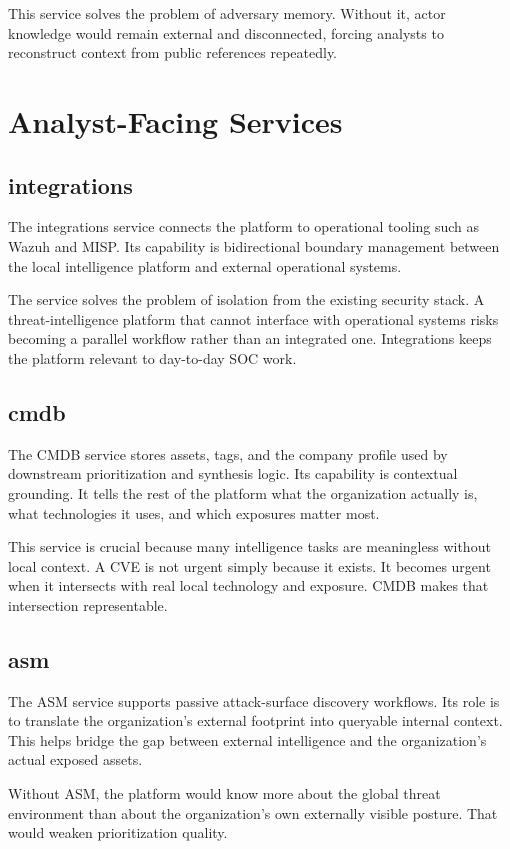 This service solves the problem of adversary memory. Without it, actor knowledge would remain external and disconnected, forcing analysts to reconstruct context from public references repeatedly.

\section{Analyst-Facing Services}
\subsection{integrations}
The integrations service connects the platform to operational tooling such as Wazuh and MISP. Its capability is bidirectional boundary management between the local intelligence platform and external operational systems.

The service solves the problem of isolation from the existing security stack. A threat-intelligence platform that cannot interface with operational systems risks becoming a parallel workflow rather than an integrated one. Integrations keeps the platform relevant to day-to-day SOC work.

\subsection{cmdb}
The CMDB service stores assets, tags, and the company profile used by downstream prioritization and synthesis logic. Its capability is contextual grounding. It tells the rest of the platform what the organization actually is, what technologies it uses, and which exposures matter most.

This service is crucial because many intelligence tasks are meaningless without local context. A CVE is not urgent simply because it exists. It becomes urgent when it intersects with real local technology and exposure. CMDB makes that intersection representable.

\subsection{asm}
The ASM service supports passive attack-surface discovery workflows. Its role is to translate the organization's external footprint into queryable internal context. This helps bridge the gap between external intelligence and the organization's actual exposed assets.

Without ASM, the platform would know more about the global threat environment than about the organization's own externally visible posture. That would weaken prioritization quality.

